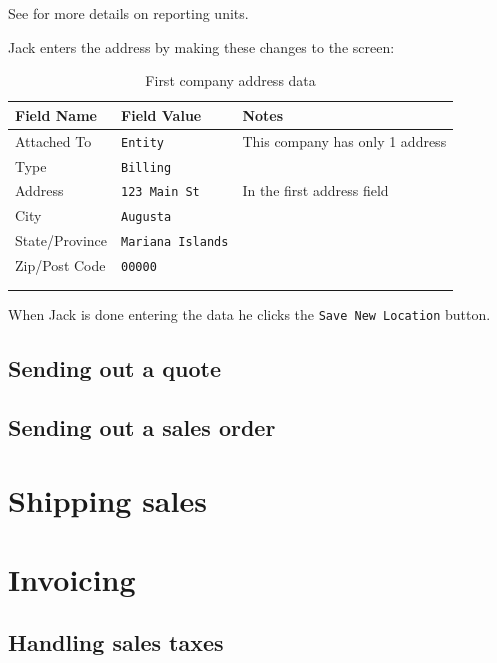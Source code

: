 See  for more details on reporting units.

Jack enters the address by making these changes to the screen:

\begin{longtable}{ llp{6cm} }
       Field Name & Field Value & Notes \\ \hline
        \endhead
        Attached To & \texttt{Entity} & This company has only 1 address\\
        Type & \texttt{Billing} & \\
        Address & \texttt{123 Main St} & In the first address field\\
        City & \texttt{Augusta} &\\
        State/Province & \texttt{Mariana Islands} & \\
        Zip/Post Code & \texttt{00000} & \\
        & & \\
    \caption{First company address data}
    \label{fig:ramping-company-address-data}
\end{longtable}

When Jack is done entering the data he clicks the \texttt{Save New Location} button.

\section{Sending out a quote} 
\label{sec-ramping-sending-a-quote}

\section{Sending out a sales order}
\label{sec-ramping-sending-a-sales-order}



\chapter{Shipping sales}
\label{cha-shipping-sales}



\chapter{Invoicing}
\label{cha-starting-invoicing}

\section{Handling sales taxes}
\label{sec-invoicing-sales-tax}

